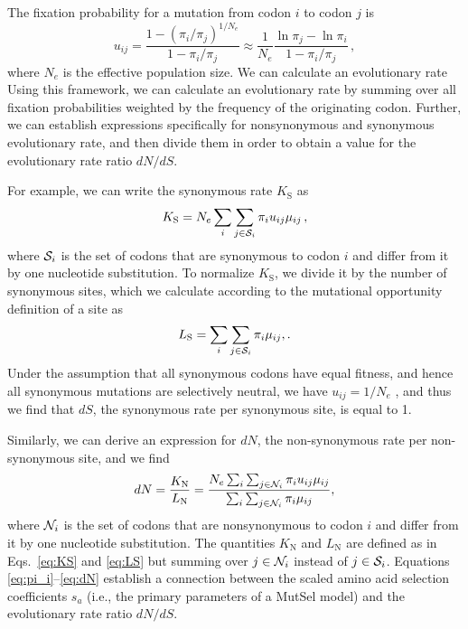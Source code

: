 \documentclass[11pt]{article}
\begin{document}
The fixation probability for a mutation from codon $i$ to codon $j$ is \cite{HalpernBruno1998,SellaHirsh2005}
\begin{equation}\label{eq:u_ij}
  u_{ij} = \frac{1-(\pi_i/\pi_j)^{1/N_e}}{1-\pi_i/\pi_j}
  \approx \frac{1}{N_e} \frac{\ln \pi_j - \ln \pi_i}{1-\pi_i/\pi_j}\,,
\end{equation}
where $N_e$ is the effective population size. We can calculate an evolutionary rate 
Using this framework, we can calculate an evolutionary rate by summing over all fixation probabilities weighted by the frequency of the originating codon. Further, we can establish expressions specifically for nonsynonymous and synonymous evolutionary rate, and then divide them in order to obtain a value for the evolutionary rate ratio $dN/dS$.

For example, we can write the synonymous rate $K_\text{S}$ as
\begin{equation}\label{eq:KS}
  K_\text{S} = N_e \sum_i \sum_{j \in {\cal S}_i} \pi_i  u_{ij}\mu_{ij}\,,
\end{equation}
where ${\cal S}_i$ is the set of codons that are synonymous to codon $i$ and differ from it by one nucleotide substitution. To normalize $K_\text{S}$, we divide it by the number of synonymous sites, which we calculate according to the mutational opportunity definition of a site \cite{GoldmanYang1994, Yang2006} as 
\begin{equation}\label{eq:LS}
  L_\text{S} = \sum_i \sum_{j \in {\cal S}_i} \pi_i \mu_{ij},.
\end{equation}
Under the assumption that all synonymous codons have equal fitness, and hence all synonymous mutations are selectively neutral, we have $u_{ij}=1/N_e$ \cite{CrowKimura1970}, and thus we find that $dS$, the synonymous rate per synonymous site, is equal to 1.

Similarly, we can derive an expression for $dN$, the non-synonymous rate per non-synonymous site, and we find
\begin{equation}\label{eq:dN}
  dN = \frac{K_\text{N}}{L_\text{N}}=\frac{ N_e \sum_i \sum_{j \in {\cal N}_i} \pi_i u_{ij} \mu_{ij} } {\sum_i \sum_{j \in {\cal N}_i} \pi_i \mu_{ij} },
\end{equation}
where ${\cal N}_i$ is the set of codons that are nonsynonymous to codon $i$ and differ from it by one nucleotide substitution. The quantities $K_\text{N}$ and $L_\text{N}$ are defined as in Eqs.~\eqref{eq:KS} and \eqref{eq:LS} but summing over $j\in {\cal N}_i$ instead of $j\in {\cal S}_i$. Equations \eqref{eq:pi_i}--\eqref{eq:dN} establish a connection between the scaled amino acid selection coefficients $s_a$ (i.e., the primary parameters of a MutSel model) and the evolutionary rate ratio $dN/dS$. 
\end{document}
